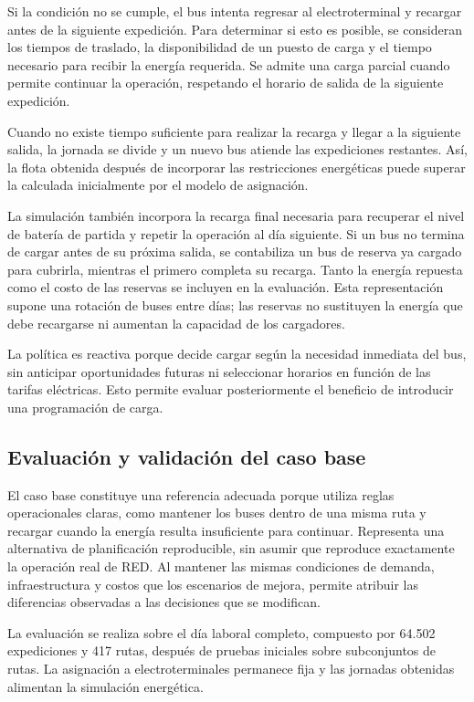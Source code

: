Si la condición no se cumple, el bus intenta regresar al electroterminal
y recargar antes de la siguiente expedición. Para determinar si esto
es posible, se consideran los tiempos de traslado, la disponibilidad
de un puesto de carga y el tiempo necesario para recibir la energía
requerida. Se admite una carga parcial cuando permite continuar
la operación, respetando el horario de salida de la siguiente expedición.

Cuando no existe tiempo suficiente para realizar la recarga y llegar
a la siguiente salida, la jornada se divide y un nuevo bus atiende
las expediciones restantes. Así, la flota obtenida después de incorporar
las restricciones energéticas puede superar la calculada inicialmente
por el modelo de asignación.

La simulación también incorpora la recarga final necesaria para recuperar
el nivel de batería de partida y repetir la operación al día siguiente.
Si un bus no termina de cargar antes de su próxima salida, se contabiliza
un bus de reserva ya cargado para cubrirla, mientras el primero completa
su recarga. Tanto la energía repuesta como el costo de las reservas
se incluyen en la evaluación. Esta representación supone una rotación
de buses entre días; las reservas no sustituyen la energía que debe
recargarse ni aumentan la capacidad de los cargadores.

La política es reactiva porque decide cargar según la necesidad inmediata
del bus, sin anticipar oportunidades futuras ni seleccionar horarios
en función de las tarifas eléctricas. Esto permite evaluar posteriormente
el beneficio de introducir una programación de carga.

\subsection{Evaluación y validación del caso base}

El caso base constituye una referencia adecuada porque utiliza reglas
operacionales claras, como mantener los buses dentro de una misma ruta y recargar
cuando la energía resulta insuficiente para continuar. Representa una
alternativa de planificación reproducible, sin asumir que reproduce
exactamente la operación real de RED. Al mantener las mismas condiciones
de demanda, infraestructura y costos que los escenarios de mejora, permite
atribuir las diferencias observadas a las decisiones que se modifican.

La evaluación se realiza sobre el día laboral completo, compuesto por
64.502 expediciones y 417 rutas, después de pruebas iniciales sobre
subconjuntos de rutas. La asignación a electroterminales permanece fija
y las jornadas obtenidas alimentan la simulación energética.

